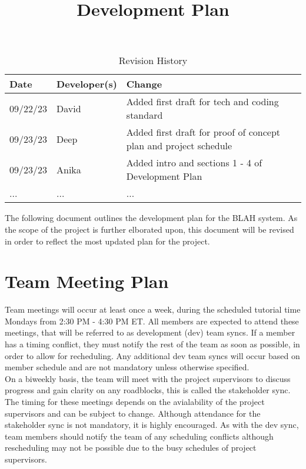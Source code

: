 \documentclass{article}
\title{Development Plan\\\progname}
\author{\authname}
\date{}
\begin{document}
\maketitle

\begin{table}[hp]
\caption{Revision History} \label{TblRevisionHistory}
\begin{tabularx}{\textwidth}{llX}
\toprule
\textbf{Date} & \textbf{Developer(s)} & \textbf{Change}\\
\midrule
09/22/23 & David & Added first draft for tech and coding standard\\
09/23/23 & Deep & Added first draft for proof of concept plan and project schedule\\
09/23/23 & Anika & Added intro and sections 1 - 4 of Development Plan\\
... & ... & ...\\
\bottomrule
\end{tabularx}
\end{table}

The following document outlines the development plan for the BLAH system.
As the scope of the project is further elborated upon, 
this document will be revised in order to reflect the most updated plan for the project.\\


\section{Team Meeting Plan} 
Team meetings will occur at least once a week, during the scheduled tutorial time Mondays from 2:30 PM - 4:30 PM ET.
All members are expected to attend these meetings, that will be referred to as development (dev) team syncs. 
If a member has a timing conflict, they must notify the rest of the team as soon as possible, in order to allow for recheduling.
Any additional dev team syncs will occur based on member schedule and are not mandatory unless otherwise specified.\\

On a biweekly basis, the team will meet with the project supervisors to discuss progress and gain clarity on any roadblocks, this is called the stakeholder sync. 
The timing for these meetings depends on the avialability of the project supervisors and can be subject to change. 
Although attendance for the stakeholder sync is not mandatory, it is highly encouraged. 
As with the dev sync, team members should notify the team of any scheduling conflicts although rescheduling may not be possible due to the busy schedules of project supervisors. \\
\end{document}
